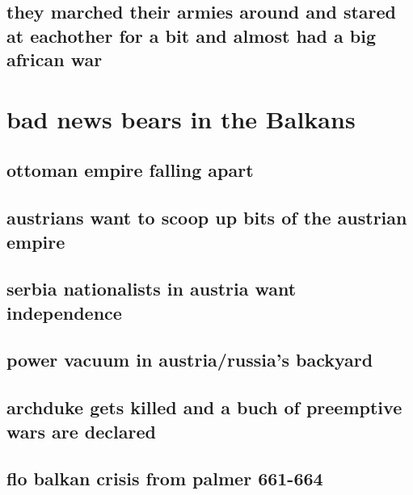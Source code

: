 \documentclass[letterpaper]{article}
\begin{document}
\subsection{they marched their armies around and stared at eachother for a bit and almost had a big african war}
\label{sec:orgc317118}
\section{bad news bears in the Balkans}
\label{sec:orge9b5bcc}
\subsection{ottoman empire falling apart}
\label{sec:orgf961dcf}
\subsection{austrians want to scoop up bits of the austrian empire}
\label{sec:orgda01814}
\subsection{serbia nationalists in austria want independence}
\label{sec:org138ffff}
\subsection{power vacuum in austria/russia's backyard}
\label{sec:org795fd65}
\subsection{archduke gets killed and a buch of preemptive wars are declared}
\label{sec:org1ea9225}
\subsection{flo balkan crisis from palmer 661-664}
\label{sec:org54aa769}
\end{document}
